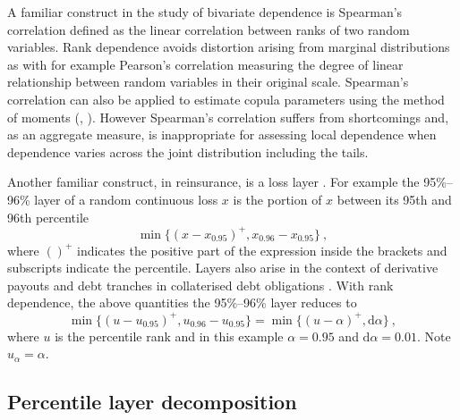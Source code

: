 \documentclass[authoryear]{elsarticle}
\newcommand{\de}{\mathrm{d}}
\begin{document}
A familiar construct in the study of bivariate dependence is Spearman's correlation \citep{embrechts2002correlation} defined as the linear correlation between ranks of two random variables. Rank dependence avoids distortion arising from marginal distributions as with for example Pearson's correlation \citep{mcneil2005qrm} measuring the degree of linear relationship between random variables in their original scale. Spearman's correlation can also be applied to estimate copula parameters using the method of moments (\cite{kojadinovic2010comparison}, \cite{bouye2000copulas}). However Spearman's correlation suffers from shortcomings and, as an aggregate measure, is inappropriate for assessing local dependence when dependence varies across the joint distribution including the tails.


Another familiar construct, in reinsurance, is a loss layer \citep{wang1995insurance}.  For example the 95\%--96\% layer of a random continuous loss $x$ is the portion of $x$ between its 95th and 96th percentile
$$
\min\{(x-x_{0.95})^+,x_{0.96}-x_{0.95}\}\ ,
$$
where $()^+$ indicates the positive part of the expression inside the brackets and subscripts indicate the percentile. Layers also arise in the context of derivative payouts and debt tranches in collaterised debt obligations \citep{mandel2012role}.  With rank dependence, the above quantities the 95\%--96\% layer reduces to
\begin{equation}\label{eg}
\min\{(u-u_{0.95})^+,u_{0.96}-u_{0.95}\} = \min\{(u-\alpha)^+,\de\alpha\}\ ,
\end{equation}
where $u$ is the percentile rank  and in this example $\alpha=0.95$ and $\de \alpha=0.01$.  Note $u_\alpha=\alpha$.


\subsection{Percentile layer decomposition}
\end{document}
